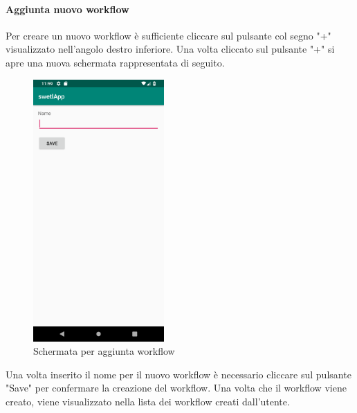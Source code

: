 \paragraph{Aggiunta nuovo workflow}
\label{sec:sec_aggiunta_nuovo_workflow}
Per creare un nuovo workflow è sufficiente cliccare sul pulsante col segno "+" visualizzato nell'angolo destro inferiore.
Una volta cliccato sul pulsante "+" si apre una nuova schermata rappresentata di seguito.
\begin{figure}[H]
	\centering
	\includegraphics[width=5cm]{../includes/pics/add_workflow.png}
	\caption{\label{fig:add_workflow}Schermata per aggiunta workflow}
\end{figure}
Una volta inserito il nome per il nuovo workflow è necessario cliccare sul pulsante "Save" per confermare la creazione del workflow. Una volta che il workflow viene creato, viene visualizzato nella lista dei workflow creati dall'utente.
\pagebreak
